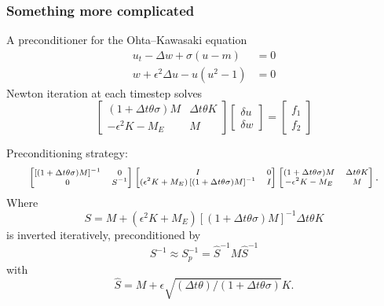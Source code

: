 \documentclass[presentation]{beamer}
\begin{document}
\begin{frame}[allowframebreaks]
  \frametitle{Something more complicated}
  A preconditioner for the Ohta--Kawasaki
  equation \parencite{Farrell:2016}
  \begin{equation*}
    \begin{split}
      u_t - \Delta w + \sigma(u - m) &= 0\\
      w + \epsilon^2 \Delta u - u(u^2 - 1) &= 0
    \end{split}
  \end{equation*}
  Newton iteration at each timestep solves
  \begin{equation*}
    \begin{bmatrix}
      (1 + \Delta t \theta \sigma)M  & \Delta t\theta K \\
      -\epsilon^2 K - M_E & M
    \end{bmatrix}
    \begin{bmatrix}
      \delta u \\
      \delta w
    \end{bmatrix} =
    \begin{bmatrix}
      f_1 \\
      f_2
    \end{bmatrix}
  \end{equation*}

  \pagebreak
  
  Preconditioning strategy:
  \begin{equation*}
    \scriptsize
    \begin{bmatrix}
      \left[(1 + \Delta t \theta \sigma)M\right]^{-1}  & 0 \\
      0 & S^{-1}
    \end{bmatrix}
    \begin{bmatrix}
      I & 0\\
      (\epsilon^2 K + M_E)\left[(1 + \Delta t \theta
        \sigma)M\right]^{-1} & I\\
    \end{bmatrix}
    \begin{bmatrix}
      (1 + \Delta t \theta \sigma)M  & \Delta t\theta K \\
      -\epsilon^2 K - M_E & M
    \end{bmatrix}.
  \end{equation*}
  Where
  \begin{equation*}
    S = M + (\epsilon^2 K + M_E) \left[(1 + \Delta t\theta\sigma)M\right]^{-1} \Delta t \theta K
  \end{equation*}
  is inverted iteratively, preconditioned by
  \begin{equation*}
    S^{-1} \approx S_p^{-1} = \hat{S}^{-1}M\hat{S}^{-1}
  \end{equation*}
  with
  \begin{equation*}
    \hat{S} = M + \epsilon\sqrt{(\Delta t \theta)/(1+\Delta t \theta\sigma)} K.
  \end{equation*}
\end{frame}
\end{document}
